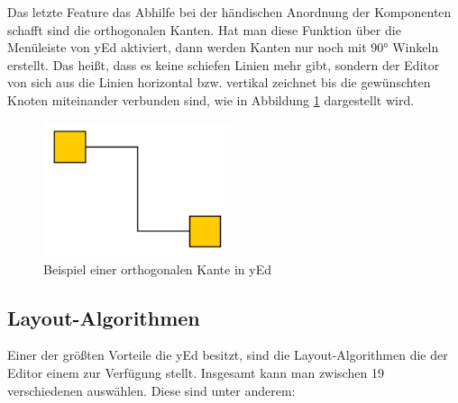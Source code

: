 Das letzte Feature das Abhilfe bei der händischen Anordnung der Komponenten schafft sind die orthogonalen Kanten. Hat man diese Funktion über die Menüleiste von yEd aktiviert, dann werden Kanten nur noch mit 90° Winkeln erstellt. Das heißt, dass es keine schiefen Linien mehr gibt, sondern der Editor von sich aus die Linien horizontal bzw. vertikal zeichnet bis die gewünschten Knoten miteinander verbunden sind, wie in Abbildung \ref{yedOrthogonaleKante} dargestellt wird.

\begin{figure}[H]
	\begin{center}
		\includegraphics[width=5.5cm]{images/yed_ortogonale_kante.png}
		\caption{Beispiel einer orthogonalen Kante in yEd}
		\label{yedOrthogonaleKante}
	\end{center}
\end{figure}

\subsection{Layout-Algorithmen}
\prc

Einer der größten Vorteile die yEd besitzt, sind die Layout-Algorithmen die der Editor einem zur Verfügung stellt. Insgesamt kann man zwischen 19 verschiedenen auswählen. Diese sind unter anderem: 

